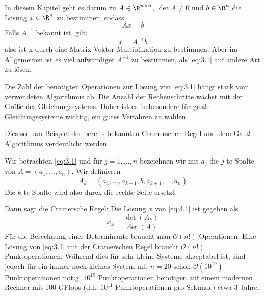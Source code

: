 \documentclass[a4paper]{scrartcl}
\numberwithin{equation}{section}
\begin{document}
In diesem Kapitel geht es darum zu $A\in \R^{n\times n}$, $\det A\neq 0$ und $b\in \R^n$ die Lösung $x\in\R^n$ zu bestimmen, sodass:
\begin{equation}
\label{eq:3.1}
Ax=b
\end{equation}
Falls $A^{-1}$ bekannt ist, gilt:
\[
x=A^{-1}b
\]
also ist x durch eine Matrix-Vektor-Multiplikation zu bestimmen.
Aber im Allgemeinen ist es viel aufwändiger $A^{-1}$ zu bestimmen, als \eqref{eq:3.1} auf andere Art zu lösen.

Die Zahl der benötigten Operationen zur Lösung von \eqref{eq:3.1} hängt stark vom verwendeten Algorithmus ab.
Die Anzahl der Rechenschritte wächst mit der Größe des Gleichungssystems.
Daher ist es insbesondere für große Gleichungssysteme wichtig, ein gutes Verfahren zu wählen.

Dies soll am Beispiel der bereits bekannten Cramerschen Regel und dem Gauß-Algorithmus verdeutlicht werden.

\begin{ex}
\label{ex:3.1}
Wir betrachten \eqref{eq:3.1} und für $j=1,\dotsc,n$ bezeichnen wir mit $a_j$ die $j$-te Spalte von $A=(a_1,\dotsc,a_n)$.
Wir definieren
\[
A_k = (a_1,\dotsc,a_{k-1},b,a_{k+1},\dotsc,a_n)
\]
Die $k$-te Spalte wird also durch die rechte Seite ersetzt.

Dann sagt die Cramersche Regel:
Die Lösung $x$ von \eqref{eq:3.1} ist gegeben als
\[
x_k = \frac {\det(A_k)}{\det(A)}
\]
Für die Berechnung einer Determinante braucht man $\mathcal O(n!)$ Operationen.
Eine Lösung von \eqref{eq:3.1} mit der Cramerschen Regel braucht $\mathcal O(n!)$  Punktoperationen.
Während dies für sehr kleine Systeme akzeptabel ist, sind jedoch für ein immer noch kleines System mit $n=20$ schon $\mathcal{O}(10^{19})$ Punktoperationen nötig. $10^{19}$ Punktoperationen benötigen auf einem modernen Rechner mit 100 GFlops (d.h. $10^{11}$ Punktoperationen pro Sekunde) etwa 3 Jahre.
\end{ex}
\end{document}
